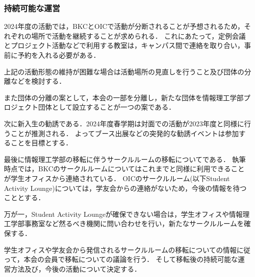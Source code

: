 \subsubsection*{持続可能な運営}
2024年度の活動では，BKCとOICで活動が分断されることが予想されるため，それぞれの場所で活動を継続することが求められる．
これにあたって，定例会議とプロジェクト活動などで利用する教室は，キャンパス間で連絡を取り合い，事前に予約を入れる必要がある．

上記の活動形態の維持が困難な場合は活動場所の見直しを行うこと及び団体の分離などを検討する．

また団体の分離の案として，本会の一部を分離し，新たな団体を情報理工学部プロジェクト団体として設立することが一つの案である．

次に新入生の勧誘である．2024年度春学期は対面での活動が2023年度と同様に行うことが推測される．
よってブース出展などの突発的な勧誘イベントは参加することを目標とする．

最後に情報理工学部の移転に伴うサークルルームの移転についてである．
執筆時点では，BKCのサークルルームについてはこれまでと同様に利用できることが学生オフィスから連絡されている．
OICのサークルルーム(以下Student Activity Lounge)については，学友会からの連絡がないため，今後の情報を待つこととする．

万が一，Student Activity Loungeが確保できない場合は，学生オフィスや情報理工学部事務室など然るべき機関に問い合わせを行い，新たなサークルルームを確保する．

学生オフィスや学友会から発信されるサークルルームの移転についての情報に従って，本会の会員で移転についての議論を行う．
そして移転後の持続可能な運営方法及び，今後の活動について決定する．